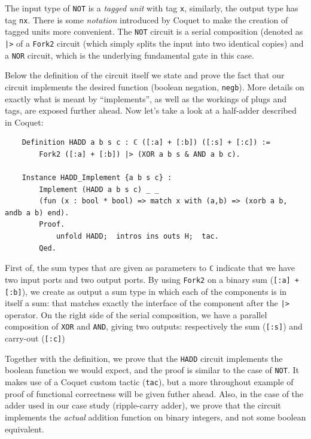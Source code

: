 \documentclass[a4paper]{article}
\begin{document}
                The input type of \texttt{NOT} is a \emph{tagged unit} with tag \texttt{x},
                similarly, the output type has tag \texttt{nx}. There is some \emph{notation}
                introduced by Coquet to make the creation of tagged units more convenient. The
                \texttt{NOT} circuit is a serial composition (denoted as \texttt{|>} of a
                \texttt{Fork2} circuit (which simply splits the input into two identical copies) and
                a \texttt{NOR} circuit, which is the underlying fundamental gate in this case.

                Below the definition of the circuit itself we state and prove the fact that our
                circuit implements the desired function (boolean negation, \texttt{negb}). More
                details on exactly what is meant by ``implements'', as well as the workings of plugs
                and tags, are exposed further ahead. Now let's take a look at a half-adder
                described in Coquet:
                \begin{verbatim}
    Definition HADD a b s c : ℂ ([:a] + [:b]) ([:s] + [:c]) :=
        Fork2 ([:a] + [:b]) |> (XOR a b s & AND a b c).

    Instance HADD_Implement {a b s c} :
        Implement (HADD a b s c) _ _
        (fun (x : bool * bool) => match x with (a,b) => (xorb a b, andb a b) end).
        Proof.
            unfold HADD;  intros ins outs H;  tac.
        Qed.
                \end{verbatim}

                First of, the sum types that are given as parameters to \texttt{ℂ} indicate that we
                have two input ports and two output ports. By using \texttt{Fork2} on a binary sum
                (\texttt{[:a] + [:b]}), we create as output a sum type in which each of the
                components is in itself a sum: that matches exactly the interface of the component
                after the \texttt{|>} operator. On the right side of the serial composition, we have
                a parallel composition of \texttt{XOR} and \texttt{AND}, giving two outputs:
                respectively the sum (\texttt{[:s]}) and carry-out (\texttt{[:c]}) 

                Together with the definition, we prove that the \texttt{HADD} circuit implements the
                boolean function we would expect, and the proof is similar to the case of
                \texttt{NOT}. It makes use of a Coquet custom tactic (\texttt{tac}), but a more
                throughout example of proof of functional correctness will be given futher ahead.
                Also, in the case of the adder used in our case study (ripple-carry adder), we prove
                that the circuit implements the \emph{actual} addition function on binary integers,
                and not some boolean equivalent.
\end{document}
